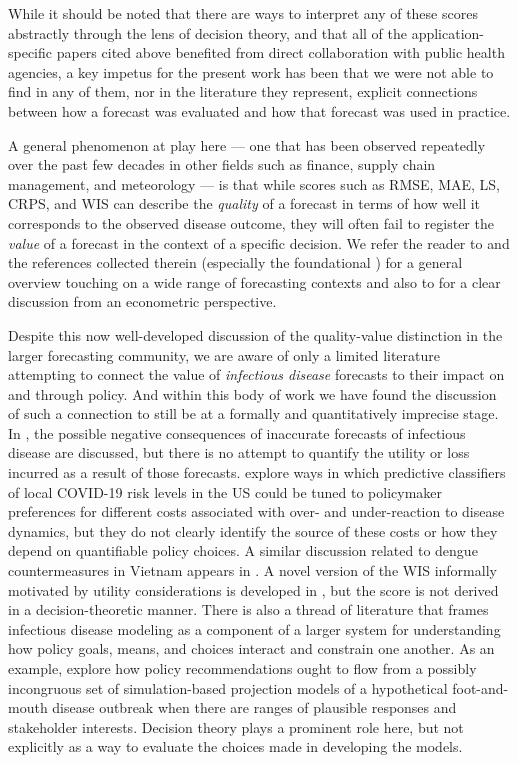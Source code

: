 \documentclass{article}\usepackage[]{graphicx}\usepackage[]{xcolor}
\begin{document}
While it should be noted that there are ways to interpret any of these scores abstractly through the lens of decision
theory, and that all of the application-specific papers cited above benefited from direct collaboration with public
health agencies, a key impetus for the present work has been that we were not able to find in any of them, nor in the
literature they represent, explicit connections between how a forecast was evaluated and how that forecast was used in
practice.

A general phenomenon at play here --- one that has been observed repeatedly over the past few decades in other fields
such as finance, supply chain management, and meteorology --- is that while scores such as RMSE, MAE, LS, CRPS, and WIS
can describe the \emph{quality} of a forecast in terms of how well it corresponds to the observed disease outcome, they
will often fail to register the \emph{value} of a forecast in the context of a specific decision. We refer the reader to
\cite{yardley2021utility_cost_forecasts} and the references collected therein (especially the foundational
\cite{murphy1993whatisagoodforecast}) for a general overview touching on a wide range of forecasting contexts and  also
to \cite{pesaran2002decision_based_eval} for a clear discussion from an econometric perspective.

Despite this now well-developed discussion of the quality-value distinction in the larger forecasting community, we are
aware of only a limited literature attempting to connect the value of \emph{infectious disease} forecasts to their
impact on and through policy.  And within this body of work we have found the discussion of such a connection to still
be at a formally and quantitatively imprecise stage. In \cite{ioannidis2022forecastingCOVIDfailed}, the possible negative
consequences of inaccurate forecasts of infectious disease are discussed, but there is no attempt to quantify the
utility or loss incurred as a result of those forecasts. \cite{bilinski_adaptive_2023} explore ways in which predictive
classifiers of local COVID-19 risk levels in the US could be tuned to policymaker preferences for different costs
associated with over- and under-reaction to disease dynamics, but they do not clearly identify the source of these
costs or how they depend on quantifiable policy choices. A similar discussion related to dengue countermeasures in
Vietnam appears in \cite{colon-gonzalez_probabilistic_2021}.  A novel version of the WIS informally motivated by
utility considerations is developed in \cite{marshall2023predictions}, but the score is not derived in a
decision-theoretic manner.  There is also a thread of literature that frames infectious disease modeling as a component
of a larger system for understanding how policy goals, means, and choices interact and constrain one another. As an
example, \cite{Probert2016decisionMakingFootMouth} explore how policy recommendations ought to flow from a possibly 
incongruous set of simulation-based projection models of a hypothetical foot-and-mouth disease outbreak when there are 
ranges of plausible responses and stakeholder interests. Decision theory plays a prominent role here, but not explicitly
as a way to evaluate the choices made in developing the models.
\end{document}
